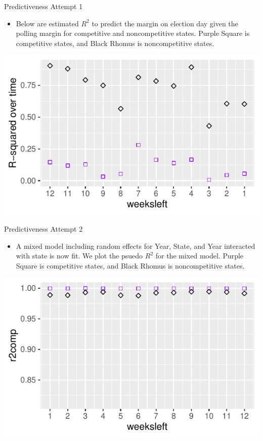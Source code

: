 \documentclass{beamer}\usepackage[]{graphicx}\usepackage[]{color}
\makeatletter
\def\maxwidth{ %
  \ifdim\Gin@nat@width>\linewidth
    \linewidth
  \else
    \Gin@nat@width
  \fi
}
\newenvironment{knitrout}{}{} %
\makeatother
\begin{document}
\begin{frame}{Predictiveness Attempt 1}
\begin{itemize}
\item Below are estimated $R^2$ to predict the margin on election day given the polling margin for competitive and noncompetitive states. Purple Square is competitive states, and Black Rhomus is noncompetitive states.
\end{itemize}
\begin{knitrout}
\color{fgcolor}
\includegraphics[width=\maxwidth]{figure/unnamed-chunk-6-1} 

\end{knitrout}

\end{frame}

\begin{frame}{Predictiveness Attempt 2}
\begin{itemize}
\item A mixed model including random effects for Year, State, and Year interacted with state is now fit.  We plot the psuedo $R^2$ for the mixed model. Purple Square is competitive states, and Black Rhomus is noncompetitive states.
\end{itemize}
\begin{knitrout}
\color{fgcolor}
\includegraphics[width=\maxwidth]{figure/unnamed-chunk-7-1} 

\end{knitrout}

\end{frame}
\end{document}
